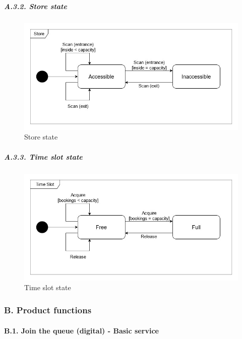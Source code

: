 \documentclass[
]{article}
\begin{document}
\hypertarget{a.3.2.-store-state}{%
\subparagraph{\texorpdfstring{A.3.2. Store state
}{A.3.2. Store state }}\label{a.3.2.-store-state}}

\begin{figure}
\centering
\includegraphics{assets/rasd/state_diagrams/store_state.jpg}
\caption{Store state}
\end{figure}

\hypertarget{a.3.3.-time-slot-state}{%
\subparagraph{\texorpdfstring{A.3.3. Time slot state
}{A.3.3. Time slot state }}\label{a.3.3.-time-slot-state}}

\begin{figure}
\centering
\includegraphics{assets/rasd/state_diagrams/time_slot_state.jpg}
\caption{Time slot state}
\end{figure}

\hypertarget{b.-product-functions}{%
\subsubsection{B. Product functions}\label{b.-product-functions}}

\hypertarget{b.1.-join-the-queue-digital---basic-service}{%
\paragraph{B.1. Join the queue (digital) - Basic
service}\label{b.1.-join-the-queue-digital---basic-service}}
\end{document}
